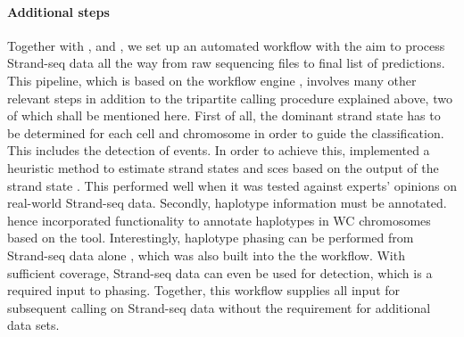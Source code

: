 
\paragraph{Additional steps}
Together with \maryam, \marschall and \david, we set up an automated workflow
with the aim to process Strand-seq data all the way from raw sequencing files to
final list of \sv predictions. This pipeline, which is based on the workflow
engine \snakemake, involves many other relevant steps in addition to the
tripartite calling procedure explained above, two of which shall be mentioned
here. First of all, the dominant strand state has to be determined for each cell
and chromosome in order to guide the \sv classification. This includes the
detection of \sce events. In order to achieve this, \venla implemented a
heuristic method to estimate strand states and \acp{sce} based on the output of
the strand state \hmm. This performed well when it was tested against experts'
opinions on real-world Strand-seq data. Secondly, haplotype information must be
annotated. \david hence incorporated functionality to annotate haplotypes in WC
chromosomes based on the \strandphaser tool. Interestingly, haplotype phasing
can be performed from Strand-seq data alone \citep{Porubsky2016}, which was also
built into the the workflow. With sufficient coverage, Strand-seq data can
even be used for \snv detection, which is a required input to phasing. Together,
this workflow supplies all input for subsequent \sv calling on Strand-seq data
without the requirement for additional data sets.





